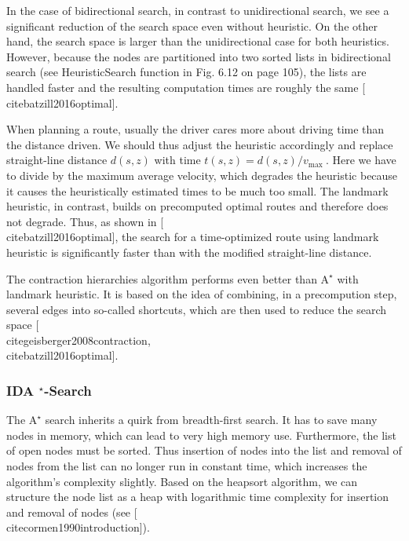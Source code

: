 \documentclass[10pt]{book}
\begin{document}
In the case of bidirectional search, in contrast to unidirectional search, we see a significant reduction of the search space even without heuristic. On the other hand, the search space is larger than the unidirectional case for both heuristics. However, because the nodes are partitioned into two sorted lists in bidirectional search (see HeuristicSearch function in Fig. 6.12 on page 105), the lists are handled faster and the resulting computation times are roughly the same [\\cite{batzill2016optimal}].

When planning a route, usually the driver cares more about driving time than the distance driven. We should thus adjust the heuristic accordingly and replace straight-line distance $d(s, z)$ with time $t(s, z)=d(s, z) / v_{\text {max }}$. Here we have to divide by the maximum average velocity, which degrades the heuristic because it causes the heuristically estimated times to be much too small. The landmark heuristic, in contrast, builds on precomputed optimal routes and therefore does not degrade. Thus, as shown in [\\cite{batzill2016optimal}], the search for a time-optimized route using landmark heuristic is significantly faster than with the modified straight-line distance.

The contraction hierarchies algorithm performs even better than $\mathrm{A}^{\star}$ with landmark heuristic. It is based on the idea of combining, in a precompution step, several edges into so-called shortcuts, which are then used to reduce the search space [\\cite{geisberger2008contraction}, \\cite{batzill2016optimal}].

\subsubsection*{IDA ${ }^{\star}$-Search}
The $\mathrm{A}^{\star}$ search inherits a quirk from breadth-first search. It has to save many nodes in memory, which can lead to very high memory use. Furthermore, the list of open nodes must be sorted. Thus insertion of nodes into the list and removal of nodes from the list can no longer run in constant time, which increases the algorithm's complexity slightly. Based on the heapsort algorithm, we can structure the node list as a heap with logarithmic time complexity for insertion and removal of nodes (see [\\cite{cormen1990introduction}]).
\end{document}
